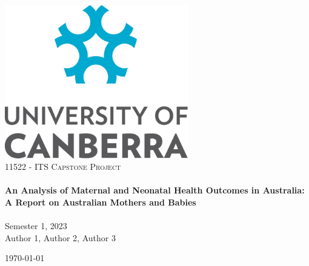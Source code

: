 \begin{titlepage}
    \vbox{ }

    \vbox{ }

    \begin{center}
        \includegraphics[width=0.6\textwidth]{img/Uc-logo.png}\\[4cm]
        \textsc{\Large 11522 - ITS Capstone Project}\\[0.7cm]

        \noindent\makebox[\linewidth]{\rule{.7\paperwidth}{.6pt}}\\[0.7cm]
        { \huge \bfseries An Analysis of Maternal and Neonatal Health Outcomes in Australia: A Report on Australian Mothers and Babies}\\[0.25cm]
        \noindent\makebox[\linewidth]{\rule{.7\paperwidth}{.6pt}}\\[0.7cm]
        \large{Semester 1, 2023}\\[1.2cm]
        \vfill
        \large
        Author 1, Author 2, Author 3

        {\large \today}
    \end{center}
\end{titlepage}